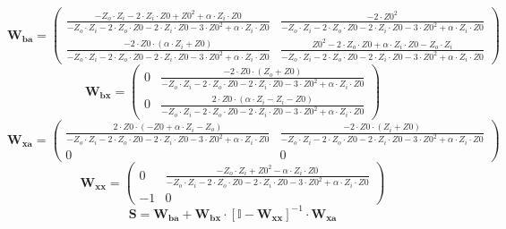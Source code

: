 \[ \mathbf{W_{ba}} = \left(\begin{smallmatrix} \frac{-Z_o\cdot
Z_i-2\cdot Z_i\cdot Z0+Z0^2+\alpha\cdot Z_i\cdot Z0}{-Z_o\cdot
Z_i-2\cdot Z_o\cdot Z0-2\cdot Z_i\cdot Z0-3\cdot Z0^2+\alpha\cdot
Z_i\cdot Z0} & \frac{-2\cdot Z0^2}{-Z_o\cdot Z_i-2\cdot Z_o\cdot
Z0-2\cdot Z_i\cdot Z0-3\cdot Z0^2+\alpha\cdot Z_i\cdot Z0} \\
\frac{-2\cdot Z0 \cdot\left(\alpha\cdot Z_i +Z0\right)}{-Z_o\cdot
Z_i-2\cdot Z_o\cdot Z0-2\cdot Z_i\cdot Z0-3\cdot Z0^2+\alpha\cdot
Z_i\cdot Z0} & \frac{Z0^2-2\cdot Z_o\cdot Z0+\alpha\cdot Z_i\cdot
Z0-Z_o\cdot Z_i}{-Z_o\cdot Z_i-2\cdot Z_o\cdot Z0-2\cdot Z_i\cdot
Z0-3\cdot Z0^2+\alpha\cdot Z_i\cdot Z0} \end{smallmatrix}\right) \]
\[ \mathbf{W_{bx}} = \left(\begin{smallmatrix} 0 & \frac{-2\cdot
Z0\cdot\left(Z_o +Z0\right)}{-Z_o\cdot Z_i-2\cdot Z_o\cdot Z0-2\cdot
Z_i\cdot Z0-3\cdot Z0^2+\alpha\cdot Z_i\cdot Z0} \\ 0 & \frac{2\cdot
Z0\cdot\left(\alpha\cdot Z_i-Z_i-Z0\right)}{-Z_o\cdot Z_i-2\cdot
Z_o\cdot Z0-2\cdot Z_i\cdot Z0-3\cdot Z0^2+\alpha\cdot Z_i\cdot Z0}
\end{smallmatrix}\right) \]
\[ \mathbf{W_{xa}} = \left(\begin{smallmatrix} \frac{2\cdot
Z0\cdot\left(-Z0+\alpha\cdot Z_i-Z_o\right)}{-Z_o\cdot Z_i-2\cdot
Z_o\cdot Z0-2\cdot Z_i\cdot Z0-3\cdot Z0^2+\alpha\cdot Z_i\cdot Z0} &
\frac{-2\cdot Z0\cdot\left(Z_i+Z0\right)}{-Z_o\cdot Z_i-2\cdot
Z_o\cdot Z0-2\cdot Z_i\cdot Z0-3\cdot Z0^2+\alpha\cdot Z_i\cdot Z0} \\
0 & 0 \end{smallmatrix}\right) \]
\[ \mathbf{W_{xx}} = \left(\begin{smallmatrix} 0 & \frac{-Z_o\cdot
Z_i+Z0^2-\alpha\cdot Z_i\cdot Z0}{-Z_o\cdot Z_i-2\cdot Z_o\cdot
Z0-2\cdot Z_i\cdot Z0-3\cdot Z0^2+\alpha\cdot Z_i\cdot Z0} \\ -1 & 0
\end{smallmatrix}\right) \]
\[ \mathbf{S}=\mathbf{W_{ba}}+\mathbf{W_{bx}}\cdot\left[ \mathbb{I}
-\mathbf{W_{xx}}\right]^{-1}\cdot\mathbf{W_{xa}} \]
